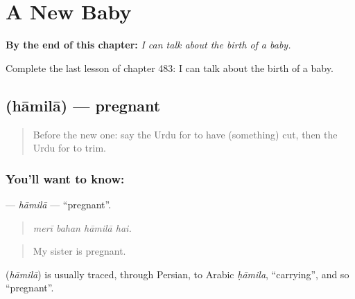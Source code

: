 
\chapter{A New Baby}
\label{ch:ur-a-new-baby}

\begin{chapteropening}
\textbf{By the end of this chapter:} \emph{I can talk about the birth of a baby.}

Complete the last lesson of chapter 483: I can talk about the birth of a baby.
\end{chapteropening}

\section[\texorpdfstring{\ur{حاملہ} (hāmilā)}{حاملہ (hāmilā)}]{ (hāmilā) — pregnant}

\label{lesson:UR-C483-hamila}



\begin{quote}
Before the new one: say the Urdu for to have (something) cut, then the Urdu for to trim.
\end{quote}

\subsection*{You'll want to know: }
\textbf{} — \emph{hāmilā} — \textquotedblleft{}pregnant\textquotedblright{}.

\begin{quote}
   
\end{quote}

\begin{quote}
\emph{merī bahan hāmilā hai.}
\end{quote}

\begin{quote}
My sister is pregnant.
\end{quote}

\begin{cousinweb}
\textbf{} (\emph{hāmilā}) is usually traced, through Persian, to Arabic \emph{ḥāmila}, \textquotedblleft{}carrying\textquotedblright{}, and so \textquotedblleft{}pregnant\textquotedblright{}.
\end{cousinweb}

